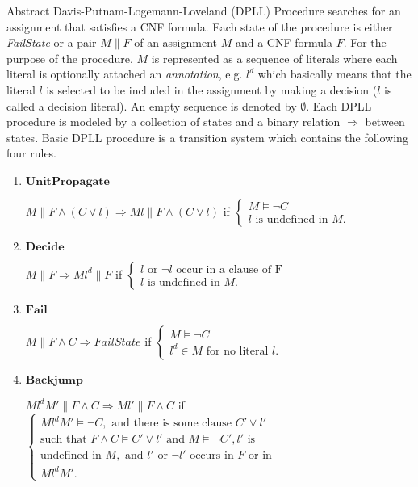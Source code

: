 Abstract Davis-Putnam-Logemann-Loveland (DPLL) Procedure \cite{Nieuwenhuis05abstractdpll} searches for an assignment that satisfies a CNF formula. Each state of the procedure is either \emph{FailState} or a pair $M \parallel  F$ of an assignment $M$ and a CNF formula $F$. For the purpose of the procedure, $M$ is represented as a sequence of literals where each literal is optionally attached an \emph{annotation}, e.g. $l^d$ which basically means that the literal $l$ is selected to be included in the assignment by making a decision ($l$ is called a decision literal). An empty sequence is denoted by $\emptyset$. Each DPLL procedure is modeled by a collection of states and a binary relation $\Longrightarrow$ between states. Basic DPLL procedure is a transition system which contains the following four rules.
\begin{enumerate}
\item $\mathbf{UnitPropagate}$

$M \parallel F \wedge (C \vee l) \Longrightarrow Ml \parallel F \wedge (C \vee l)$ if $\left\{ 
  \begin{array}{l}
    M \models \neg C \\
    l\text{ is undefined in }M.
  \end{array} \right.$
  
\item $\mathbf{Decide}$

$M \parallel F \Longrightarrow Ml^d \parallel F$ if $\left\{ 
  \begin{array}{l}
    l \text{ or } \neg l \text{ occur in a clause of F} \\
    l\text{ is undefined in }M.
  \end{array} \right.$

\item $\mathbf{Fail}$

$M \parallel F \wedge C \Longrightarrow FailState$ if $\left\{ 
  \begin{array}{l}
    M \models \neg C \\
    l^d \in M \text{ for no literal }l.
  \end{array} \right.$  
  
\item $\mathbf{Backjump}$

$Ml^dM' \parallel F \wedge C \Longrightarrow Ml' \parallel F \wedge C$ if $\left\{ 
  \begin{array}{l}
    Ml^dM' \models \neg C,\text{ and there is some clause } C' \vee l'\\ 
    \text{such that }
    F \wedge C \models C' \vee l'
    \text{ and }M \models \neg C', l' \text{ is }\\
    \text{undefined in } M, \text{ and } l' \text{ or } \neg l' \text{ occurs in } F \text{ or in } \\Ml^dM'.
  \end{array} \right.$  
\end{enumerate}

